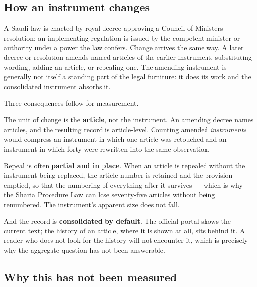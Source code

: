 \documentclass[11pt]{article}
\begin{document}
\subsection{How an instrument changes}

A Saudi law is enacted by royal decree approving a Council of Ministers
resolution; an implementing regulation is issued by the competent minister or
authority under a power the law confers. Change arrives the same way. A later
decree or resolution amends named articles of the earlier instrument,
substituting wording, adding an article, or repealing one. The amending
instrument is generally not itself a standing part of the legal furniture: it
does its work and the consolidated instrument absorbs it.

Three consequences follow for measurement.

The unit of change is the \textbf{article}, not the instrument. An amending
decree names articles, and the resulting record is article-level. Counting
amended \emph{instruments} would compress an instrument in which one article
was retouched and an instrument in which forty were rewritten into the same
observation.

Repeal is often \textbf{partial and in place}. When an article is repealed
without the instrument being replaced, the article number is retained and the
provision emptied, so that the numbering of everything after it survives ---
which is why the Sharia Procedure Law can lose seventy-five articles without
being renumbered. The instrument's apparent size does not fall.

And the record is \textbf{consolidated by default}. The official portal shows
the current text; the history of an article, where it is shown at all, sits
behind it. A reader who does not look for the history will not encounter it,
which is precisely why the aggregate question has not been answerable.

\subsection{Why this has not been measured}
\end{document}
